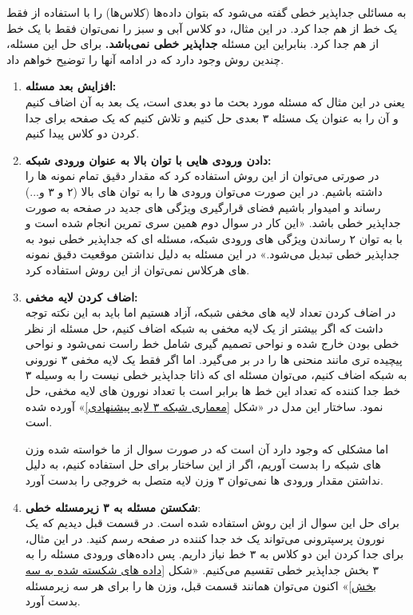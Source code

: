 \begin{qsolve}
	به مسائلی جداپذیر خطی گفته می‌شود که بتوان داده‌ها (کلاس‌ها) را با استفاده از فقط یک خط از هم جدا کرد. در این مثال، دو کلاس آبی و سبز را نمی‌توان فقط با یک خط از هم جدا کرد. بنابراین این مسئله \textbf{جداپذیر خطی نمی‌باشد.} برای حل این مسئله، چندین روش وجود دارد که در ادامه آنها را توضیح خواهم داد.
	
	\begin{enumerate}
		\item \textbf{افزایش بعد مسئله: }\\
		یعنی در این مثال که مسئله مورد بحث ما دو بعدی است، یک بعد به آن اضاف کنیم و آن را به عنوان یک مسئله ۳ بعدی حل کنیم و تلاش کنیم که یک صفحه برای جدا کردن دو کلاس پیدا کنیم.
		
		\item \textbf{دادن ورودی هایی با توان بالا به عنوان ورودی شبکه: }\\
		در صورتی می‌توان از این روش استفاده کرد که مقدار دقیق تمام نمونه ها را داشته باشیم. در این صورت می‌توان ورودی ها را به توان های بالا (۲ و ۳ و...) رساند و امیدوار باشیم فضای قرارگیری ویژگی های جدید در صفحه به صورت جداپذیر خطی باشد. «این کار در سوال دوم همین سری تمرین انجام شده است و با به توان ۲ رساندن ویژگی های ورودی شبکه، مسئله ای که جداپذیر خطی نبود به جداپذیر خطی تبدیل می‌شود.» در این مسئله به دلیل نداشتن موقعیت دقیق نمونه های هرکلاس نمی‌توان از این روش استفاده کرد.
		
		\item \textbf{اضاف کردن لایه مخفی: }\\
		در اضاف کردن تعداد لایه های مخفی شبکه، آزاد هستیم اما باید به این نکته توجه داشت که اگر بیشتر از یک لایه مخفی به شبکه اضاف کنیم، حل مسئله از نظر خطی بودن خارج شده و نواحی تصمیم گیری شامل خط راست نمی‌شود و نواحی پیچیده تری مانند منحنی ها را در بر می‌گیرد. اما اگر فقط یک لایه مخفی ۳ نورونی به شبکه اضاف کنیم، می‌توان مسئله ای که ذاتا جدا‌پذیر خطی نیست را به وسیله ۳ خط جدا کننده که تعداد این خط ها برابر است با تعداد نورون های لایه مخفی، حل نمود. ساختار این مدل در «شکل \ref{معماری شبکه ۳ لایه پیشنهادی}» آورده شده است.
		
		اما مشکلی که وجود دارد آن است که در صورت سوال از ما خواسته شده وزن های شبکه را بدست آوریم، اگر از این ساختار برای حل استفاده کنیم، به دلیل نداشتن مقدار ورودی ها نمی‌توان ۳ وزن لایه متصل به خروجی را بدست آورد.
		
		\item \textbf{شکستن مسئله به ۳ زیرمسئله خطی}: \\
		برای حل این سوال از این روش استفاده شده است. در قسمت قبل دیدیم که یک نورون پرسپترونی می‌تواند یک خد جدا کننده در صفحه رسم کنید. در این مثال، برای جدا کردن این دو کلاس به ۳ خط نیاز داریم. پس داده‌های ورودی مسئله را به ۳ بخش جدا‌پذیر خطی تقسیم می‌کنیم. «شکل \ref{داده های شکسته شده به سه بخش}» اکنون می‌توان همانند قسمت قبل، وزن ها را برای هر سه زیر‌مسئله بدست آورد.
	\end{enumerate}
\end{qsolve}






